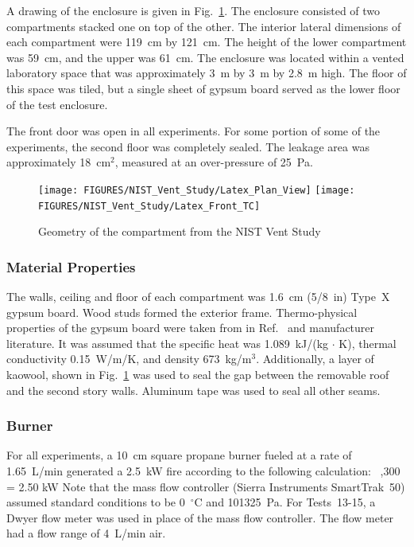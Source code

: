 A drawing of the enclosure is given in Fig.~\ref{NIST_Vent_Study_Drawing}. The enclosure consisted of two compartments stacked one on top of the other. The interior lateral dimensions of each compartment were 119~cm by 121~cm. The height of the lower compartment was 59~cm, and the upper was 61~cm. The enclosure was located within a vented laboratory space that was approximately 3~m by 3~m by 2.8~m high. The floor of this space was tiled, but a single sheet of gypsum board served as the lower floor of the test enclosure.

The front door was open in all experiments. For some portion of some of the experiments, the second floor was completely sealed. The leakage area was approximately 18~cm$^2$, measured at an over-pressure of 25~Pa.

\begin{figure}[p]
\texttt{[image: FIGURES/NIST\_Vent\_Study/Latex\_Plan\_View]}
\texttt{[image: FIGURES/NIST\_Vent\_Study/Latex\_Front\_TC]}
\caption[Geometry of the compartment from the NIST Vent Study]{Geometry of the compartment from the NIST Vent Study}
\label{NIST_Vent_Study_Drawing}
\end{figure}

\subsubsection{Material Properties}

The walls, ceiling and floor of each compartment was 1.6~cm (5/8~in) Type~X gypsum board. Wood studs formed the exterior frame. Thermo-physical properties of the gypsum board were taken from in Ref.~\cite{Manzello:SiF08} and manufacturer literature. It was assumed that the specific heat was 1.089~kJ/(kg $\cdot$ K), thermal conductivity 0.15~W/m/K, and density 673~kg/m$^3$.  Additionally, a  layer of kaowool, shown in Fig.~\ref{NIST_Vent_Study_Drawing} was used to seal the gap between the removable roof and the second story walls. Aluminum tape was used to seal all other seams.

\subsubsection{Burner}

For all experiments, a 10~cm square propane burner fueled at a rate of 1.65~L/min generated a 2.5~kW fire according to the following calculation:
  \times {}  \times {}   \,  ,300 \,  = 2.50 \; {\rm kW}
\label{Conversion_Equation}
\ee
Note that the mass flow controller (Sierra Instruments SmartTrak~50) assumed standard conditions to be 0~$^\circ$C and 101325~Pa. For Tests~13-15, a Dwyer flow meter was used in place of the mass flow controller. The flow meter had a flow range of 4~L/min air.

